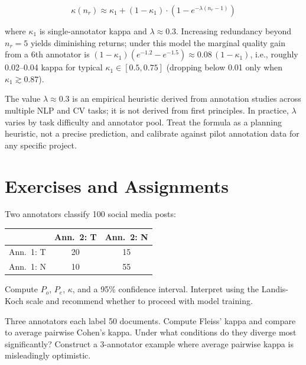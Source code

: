 \[
\kappa(n_r) \approx \kappa_1 + (1 - \kappa_1) \cdot \left(1 - e^{-\lambda(n_r - 1)}\right)
\]

where $\kappa_1$ is single-annotator kappa and $\lambda \approx 0.3$. Increasing redundancy beyond $n_r = 5$ yields diminishing returns; under this model the marginal quality gain from a 6th annotator is $(1-\kappa_1)(e^{-1.2} - e^{-1.5}) \approx 0.08\,(1-\kappa_1)$, i.e., roughly 0.02--0.04 kappa for typical $\kappa_1 \in [0.5, 0.75]$ (dropping below 0.01 only when $\kappa_1 \gtrsim 0.87$).

\begin{technote}
The value $\lambda \approx 0.3$ is an empirical heuristic derived from annotation studies across multiple NLP and CV tasks; it is not derived from first principles. In practice, $\lambda$ varies by task difficulty and annotator pool. Treat the formula as a planning heuristic, not a precise prediction, and calibrate against pilot annotation data for any specific project.
\end{technote}

\section{Exercises and Assignments}

\begin{Exercise}
Two annotators classify 100 social media posts:
\begin{center}
\begin{tabular}{@{}lcc@{}}
\toprule
 & Ann.~2: T & Ann.~2: N \\
\midrule
Ann.~1: T & 20 & 15 \\
Ann.~1: N & 10 & 55 \\
\bottomrule
\end{tabular}
\end{center}
Compute $P_o$, $P_e$, $\kappa$, and a 95\% confidence interval. Interpret using the Landis-Koch scale and recommend whether to proceed with model training.
\end{Exercise}

\begin{Exercise}
Three annotators each label 50 documents. Compute Fleiss' kappa and compare to average pairwise Cohen's kappa. Under what conditions do they diverge most significantly? Construct a 3-annotator example where average pairwise kappa is misleadingly optimistic.
\end{Exercise}

